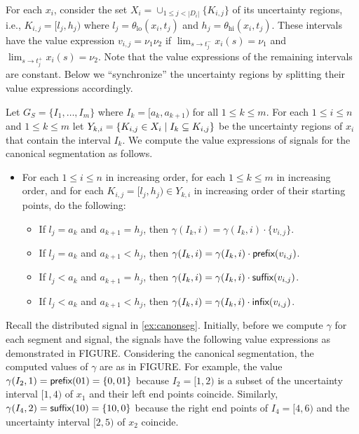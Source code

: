 For each $x_i$, consider the set $X_i = \cup_{1 \leq j < |D_i|} \{K_{i,j}\}$ of its uncertainty regions, i.e.,  $K_{i,j} = [l_j, h_j)$ where $l_j = \theta_{\text{lo}}(x_i, t_j)$ and $h_j = \theta_{\text{hi}}(x_i, t_j)$.
These intervals have the value expression $v_{i,j} = \nu_1 \nu_2$ if $\lim_{s \to t_j^-} x_i(s) = \nu_1$ and $\lim_{s \to t_j^+} x_i(s) = \nu_2$.
Note that the value expressions of the remaining intervals are constant.
Below we ``synchronize'' the uncertainty regions by splitting their value expressions accordingly.

Let $G_S = \{I_1, \ldots, I_m\}$ where $I_k = [a_k, a_{k+1})$ for all $1 \leq k \leq m$.
For each $1 \leq i \leq n$ and $1 \leq k \leq m$ let $Y_{k,i} = \{ K_{i,j} \in X_i \st I_k \subseteq K_{i,j}\}$ be the uncertainty regions of $x_i$ that contain the interval $I_k$.
We compute the value expressions of signals for the canonical segmentation as follows.
\begin{itemize}
	\item For each $1 \leq i \leq n$ in increasing order, for each $1 \leq k \leq m$ in increasing order, and for each $K_{i,j} = [l_j, h_j) \in Y_{k,i}$ in increasing order of their starting points, do the following:
	\begin{itemize}
		\item If $l_j = a_k$ and $a_{k+1} = h_j$, then $\gamma(I_k, i) = \gamma(I_k, i) \cdot \{v_{i,j}\}$.
		\item If $l_j = a_k$ and $a_{k+1} < h_j$, then $\gamma(I_k, i) = \gamma(I_k, i) \cdot \textsf{prefix}(v_{i,j})$.
		\item If $l_j < a_k$ and $a_{k+1} = h_j$, then $\gamma(I_k, i) = \gamma(I_k, i) \cdot \textsf{suffix}(v_{i,j})$.
		\item If $l_j < a_k$ and $a_{k+1} < h_j$, then $\gamma(I_k, i) = \gamma(I_k, i) \cdot \textsf{infix}(v_{i,j})$.
	\end{itemize}
\end{itemize}

\begin{example}
	Recall the distributed signal in \cref{ex:canonseg}.
	Initially, before we compute $\gamma$ for each segment and signal, the signals have the following value expressions as demonstrated in \alert{FIGURE}.
	Considering the canonical segmentation, the computed values of $\gamma$ are as in \alert{FIGURE}.
	For example, the value $\gamma(I_2,1) = \textsf{prefix}(01) = \{0, 01\}$ because $I_2 = [1,2)$ is a subset of the uncertainty interval $[1,4)$ of $x_1$ and their left end points coincide.
	Similarly, $\gamma(I_4,2) = \textsf{suffix}(10) = \{ 10, 0\}$ because the right end points of $I_4 = [4,6)$ and the uncertainty interval $[2,5)$ of $x_2$ coincide.
\end{example}

